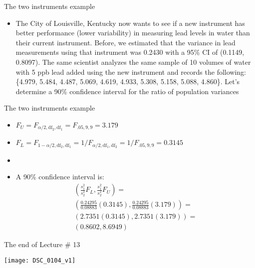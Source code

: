 \documentclass[xcolor=dvipsnames]{beamer}
\begin{document}
\begin{frame}{The two instruments example}
	\begin{itemize}
			\item The City of Louisville, Kentucky now wants to see if a new instrument has better performance (lower variability) in measuring lead levels in water than their current instrument. Before, we estimated that the variance in lead measurements using that instrument was 0.2430 with a 95\% CI of (0.1149, 0.8097). The same scientist analyzes the same sample of 10 volumes of water with 5 ppb lead added using the new instrument and records the following: \{4.979, 5.484, 4.487, 5.069, 4.619, 4.933, 5.308, 5.158, 5.088, 4.860\}. Let's determine a 90\% confidence interval for the ratio of population variances
	\end{itemize}
\end{frame}

\begin{frame}{The two instruments example}
	\begin{itemize}
		\item $F_U = F_{\alpha / 2, \text{df}_2, \text{df}_1}=F_{.05, 9, 9}= 3.179$
		\item $F_L = F_{1-\alpha / 2, \text{df}_2, \text{df}_1} = 1 / F_{\alpha / 2, \text{df}_1, \text{df}_2} = 1 / F_{.05, 9, 9} = 0.3145$
		\item[]
		\item A 90\% confidence interval is:
		\begin{gather*}
		\left(\frac{s_1^2}{s_2^2} F_L, \frac{s_1^2}{s_2^2} F_U \right)=\\
		 \left(\frac{0.24295}{0.08883} (0.3145), \frac{0.24295}{0.08883} (3.179)\right) =\\
		 \left(2.7351(0.3145), 2.7351 (3.179)\right) = \\
		 (0.8602, 8.6949)
		\end{gather*}
	\end{itemize}
\end{frame}

\begin{frame}{The end of Lecture \# 13}
	\begin{center}
		\texttt{[image: DSC\_0104\_v1]}
	\end{center}
\end{frame}
\end{document}
